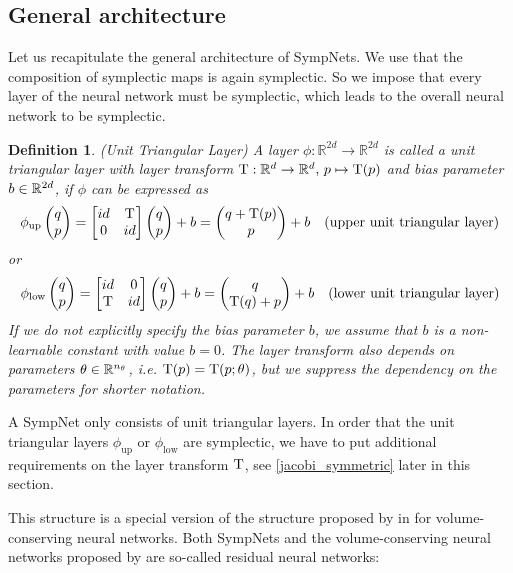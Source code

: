 \documentclass[twoside,a4paper]{article}
\newtheorem{definition}{Definition}
\begin{document}
\subsection{General architecture}

Let us recapitulate the general architecture of SympNets.
We use that the composition of symplectic maps is again symplectic. So we impose that every
layer of the neural network must be symplectic, which leads to the overall neural network
to be symplectic.

\begin{definition}
	(Unit Triangular Layer) A layer $\phi : \mathbb{R}^{2d} \to \mathbb{R}^{2d}$ 
	is called a unit triangular layer with layer transform 
	$\mathrm{T} : \mathbb{R}^d \to \mathbb{R}^d,\, p \mapsto \mathrm{T}(p)$
	and bias parameter $b \in \mathbb{R}^{2d}$, if $\phi$ can be expressed as
	\begin{equation*}
		\phi_{\text{up}} \begin{pmatrix} q \\ p \end{pmatrix} = \begin{bmatrix} id & {\mathrm{T}} \\ 0 & id \end{bmatrix} \begin{pmatrix} q \\ p \end{pmatrix} + b
		= \begin{pmatrix}
			q + \mathrm{T}(p) \\
			p
		\end{pmatrix} + b \quad \text{(upper unit triangular layer)}
	\end{equation*}
	or
	\begin{equation*}
		\phi_{\text{low}} \begin{pmatrix} q \\ p \end{pmatrix} = \begin{bmatrix} id & 0 \\ {\mathrm{T}} & id \end{bmatrix} \begin{pmatrix} q \\ p \end{pmatrix} + b
		= \begin{pmatrix}
			q \\
			\mathrm{T}(q) + p
		\end{pmatrix} + b \quad \text{(lower unit triangular layer)}
	\end{equation*}
	If we do not explicitly specify the bias parameter $b$, we assume
	that $b$ is a non-learnable constant with value $b=0$. The layer transform
	also depends on parameters $\theta \in \mathbb{R}^{n_\theta}$, i.e.
	$\mathrm{T}(p) = \mathrm{T}(p;\theta)$, 
	but we suppress the dependency on the parameters for shorter notation.
\end{definition}

A SympNet only consists of unit triangular layers. In order that the unit triangular layers 
$\phi_{\text{up}}$ or $\phi_{\text{low}}$ are symplectic,
we have to put additional requirements on the layer transform $\mathrm{T}$, see
\cref{jacobi_symmetric} later in this section.

This structure is a special version
of the structure proposed by \citeauthor{Deco1995} in \cite{Deco1995} 
for volume-conserving neural networks. Both SympNets and the volume-conserving neural
networks proposed by \citeauthor{Deco1995} are so-called residual neural networks:
\end{document}

